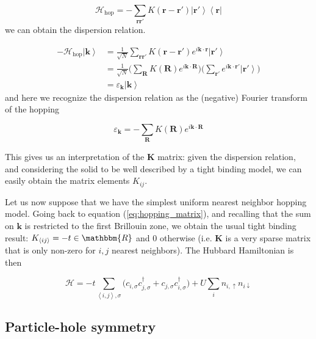 \begin{equation}
\mathcal{H}_{\text{hop}} = - \sum_{\bm r \bm r'} K (\bm r - \bm r') \left| \bm r' \right\rangle \left\langle \bm r \right|
\end{equation}
we can obtain the dispersion relation.

\begin{equation}
\begin{split}
- \mathcal{H}_{\text{hop}} \left| \bm k \right\rangle &= \frac{1}{\sqrt{N}} \sum_{\bm r \bm r'} K ( \bm r - \bm r' ) e^{i \bm k \cdot \bm r} \left| \bm r' \right \rangle \\
&= \frac{1}{\sqrt{N}} \bigg( \sum_{\bm R} K(\bm R) e^{i\bm k \cdot \bm R} \bigg) \bigg( \sum_{\bm r'} e^{i\bm k \cdot \bm r'} \left| \bm r' \right\rangle \bigg) \\
& = \varepsilon_{\bm k} \left| \bm k \right\rangle
\end{split}
\end{equation}
and here we recognize the dispersion relation as the (negative) Fourier transform of the hopping

\begin{equation}
\varepsilon_{\bm k} = - \sum_{\bm R} K(\bm R) e^{i\bm k \cdot \bm R} 
\end{equation}

This gives us an interpretation of the $\bm K$ matrix: given the dispersion relation, and considering the solid to be well described by a tight binding model, we can easily obtain the matrix elements $K_{i j}$.

Let us now suppose that we have the simplest uniform nearest neighbor hopping model. Going back to equation (\ref{eq:hopping_matrix}), and recalling that the sum on $\bm k$ is restricted to the first Brillouin zone, we obtain the usual tight binding result: $K_{\left\langle i j \right\rangle} = - t \in \mathbbm{R}$ and $0$ otherwise (i.e. $\bm K$ is a very sparse matrix that is only non-zero for $i, j$ nearest neighbors). The Hubbard Hamiltonian is then

\begin{equation}\label{eq:hubbard_hamiltonian}
\mathcal{H} = - t \sum_{\left\langle i, j \right\rangle, \sigma} \bigg(c_{i,\sigma} c_{j,\sigma}^\dagger + c_{j,\sigma} c_{i,\sigma}^\dagger \bigg) + U \sum_{i} n_{i,\uparrow} n_{i\downarrow}
\end{equation}

\subsection{Particle-hole symmetry}

